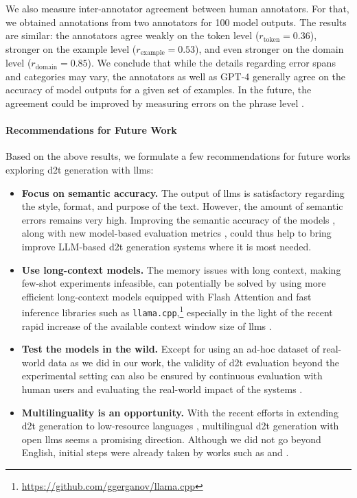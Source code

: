 We also measure inter-annotator agreement between human annotators. For that, we obtained annotations from two annotators for 100 model outputs. The results are similar: the annotators agree weakly on the token level ($r_{\text{token}}=0.36$), stronger on the example level ($r_{\text{example}}=0.53$), and even stronger on the domain level ($r_{\text{domain}}=0.85$). We conclude that while the details regarding error spans and categories may vary, the annotators as well as GPT-4 generally agree on the accuracy of model outputs for a given set of examples. In the future, the agreement could be improved by measuring errors on the phrase level \cite{vamvas2022little}.


\paragraph{Recommendations for Future Work}
Based on the above results, we formulate a few recommendations for future works exploring \ac{d2t} generation with \acp{llm}:
\begin{itemize}
    \item \textbf{Focus on semantic accuracy.} The output of \acp{llm} is satisfactory regarding the style, format, and purpose of the text. However, the amount of semantic errors remains very high. Improving the semantic accuracy of the models
          \cite{li2022faithfulness}, along with new model-based evaluation metrics \cite{liuGEvalNLGEvaluation2023,xuINSTRUCTSCOREExplainableText2023}, could thus help to bring improve LLM-based \ac{d2t} generation systems where it is most needed.
          \item\textbf{Use long-context models.} The memory issues with long context, making few-shot experiments infeasible, can potentially be solved by using more efficient long-context models equipped with Flash Attention \cite{dao2022flashattention} and fast inference libraries such as \texttt{llama.cpp},\footnote{\url{https://github.com/ggerganov/llama.cpp}} especially in the light of the recent rapid increase of the available context window size of \acp{llm} \cite{bai2023longbench,munkhdalai2024leave}.
          \item\textbf{Test the models in the wild.} Except for using an ad-hoc dataset of real-world data as we did in our work, the validity of \ac{d2t} evaluation beyond the experimental setting can also be ensured by continuous evaluation with human users \cite{zheng2023judging} and evaluating the real-world impact of the systems \cite{reiter2023impact}.
          \item\textbf{Multilinguality is an opportunity.} With the recent efforts in extending \ac{d2t} generation to low-resource languages \cite{cripwell2023WebNLGShared2023}, multilingual \ac{d2t} generation with open \acp{llm} seems a promising direction. Although we did not go beyond English, initial steps were already taken by works such as \citet{lorandi2023data} and \citet{lorandi-belz-2024-high}.
\end{itemize}

